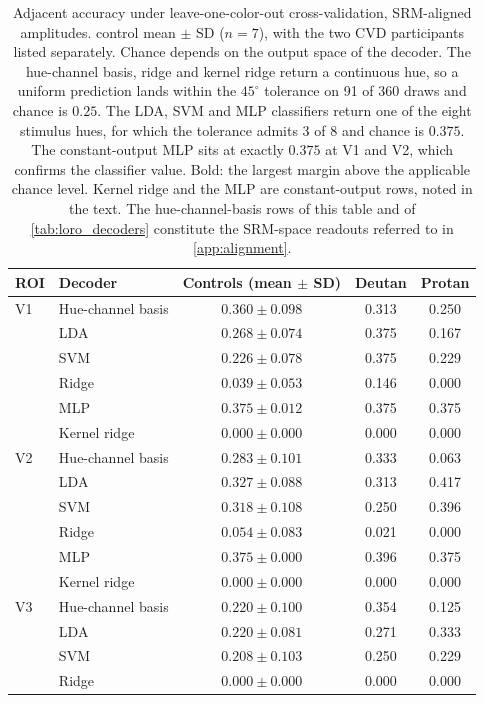 \begin{table}[h]
\centering
\caption{Adjacent accuracy under leave-one-color-out cross-validation, SRM-aligned amplitudes. control mean $\pm$ SD ($n = 7$), with the two CVD participants listed separately. Chance depends on the output space of the decoder. The hue-channel basis, ridge and kernel ridge return a continuous hue, so a uniform prediction lands within the $45^\circ$ tolerance on 91 of 360 draws and chance is $0.25$. The LDA, SVM and MLP classifiers return one of the eight stimulus hues, for which the tolerance admits 3 of 8 and chance is $0.375$. The constant-output MLP sits at exactly $0.375$ at V1 and V2, which confirms the classifier value. Bold: the largest margin above the applicable chance level. Kernel ridge and the MLP are constant-output rows, noted in the text. The hue-channel-basis rows of this table and of \cref{tab:loro_decoders} constitute the SRM-space readouts referred to in \cref{app:alignment}.}
\label{tab:loco_decoders}
\begin{tabular}{llccc}
\toprule
ROI & Decoder & Controls (mean $\pm$ SD) & Deutan & Protan \\
\midrule
V1 & Hue-channel basis & $0.360 \pm 0.098$ & 0.313 & 0.250 \\
   & LDA & $0.268 \pm 0.074$ & 0.375 & 0.167 \\
   & SVM & $0.226 \pm 0.078$ & 0.375 & 0.229 \\
   & Ridge & $0.039 \pm 0.053$ & 0.146 & 0.000 \\
   & MLP & $0.375 \pm 0.012$ & 0.375 & 0.375 \\
   & Kernel ridge & $0.000 \pm 0.000$ & 0.000 & 0.000 \\
\midrule
V2 & Hue-channel basis & $0.283 \pm 0.101$ & 0.333 & 0.063 \\
   & LDA & $0.327 \pm 0.088$ & 0.313 & 0.417 \\
   & SVM & $0.318 \pm 0.108$ & 0.250 & 0.396 \\
   & Ridge & $0.054 \pm 0.083$ & 0.021 & 0.000 \\
   & MLP & $0.375 \pm 0.000$ & 0.396 & 0.375 \\
   & Kernel ridge & $0.000 \pm 0.000$ & 0.000 & 0.000 \\
\midrule
V3 & Hue-channel basis & $0.220 \pm 0.100$ & 0.354 & 0.125 \\
   & LDA & $0.220 \pm 0.081$ & 0.271 & 0.333 \\
   & SVM & $0.208 \pm 0.103$ & 0.250 & 0.229 \\
   & Ridge & $0.000 \pm 0.000$ & 0.000 & 0.000 \\

\end{tabular}
\end{table}
